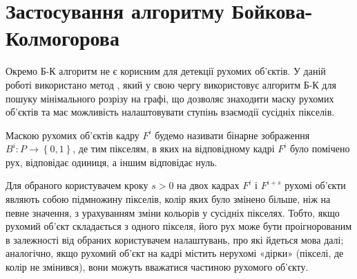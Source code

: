\section{Застосування алгоритму Бойкова-Колмогорова}

Окремо Б-К алгоритм не є корисним для детекції рухомих об'єктів. У даній роботі 
використано метод \cite{pavliuk_krygin}, який у свою чергу використовує алгоритм Б-К 
для пошуку мінімального розрізу на графі, що дозволяє знаходити
маску рухомих об'єктів та має можливість налаштовувати ступінь взаємодії сусідніх
пікселів.
\begin{definition}
Маскою рухомих об'єктів кадру \(F^{i}\) будемо називати бінарне
зображення \(B^{i}:P \rightarrow \left\{ 0,1 \right\}\), де тим
пікселям, в яких на відповідному кадрі \(F^{i}\) було помічено рух,
відповідає одиниця, а іншим відповідає нуль.
\end{definition}

 Для обраного користувачем
кроку \(s > 0\) на двох кадрах \(F^{i}\) і \(F^{i + s}\) рухомі об'єкти
являють собою підмножину пікселів, колір яких було змінено більше, ніж
на певне значення, з урахуванням зміни кольорів у сусідніх пікселях.
Тобто, якщо рухомий об'єкт складається з одного пікселя, його рух може
бути проігнорованим в залежності від обраних користувачем налаштувань,
про які йдеться мова далі; аналогічно, якщо рухомий об'єкт на кадрі
містить нерухомі «дірки» (пікселі, де колір не змінився), вони можуть
вважатися частиною рухомого об'єкту.

